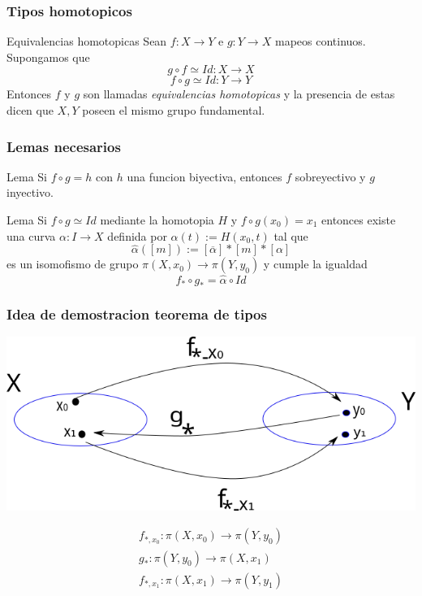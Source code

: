 \documentclass[xetex,mathserif,serif]{beamer}
\begin{document}
  \begin{frame}
    \frametitle{Tipos homotopicos}
    \begin{block}{Equivalencias homotopicas}
      Sean \(f : X \to Y\) e \(g : Y \to X\) mapeos continuos. Supongamos
      que \[ g \circ f \simeq Id : X \to X \]
      \[ f \circ g \simeq Id : Y \to Y \]
      Entonces \(f\) y \(g\) son llamadas \emph{equivalencias
      homotopicas} y la presencia de estas dicen que \(X,Y\) poseen el
      mismo grupo fundamental.
    \end{block}

  \end{frame}
  \begin{frame}
    \frametitle{Lemas necesarios}
    \begin{block}{Lema}
      Si \(f \circ g = h\) con \(h\) una funcion biyectiva, entonces
      \(f\) sobreyectivo y \(g\) inyectivo.
    \end{block}
    \begin{block}{Lema}
      Si \(f \circ g \simeq Id\) mediante la homotopia \(H\) y \(f \circ
      g (x_0) = x_1\) entonces existe una curva \(\alpha : I \to X\)
      definida por \(\alpha (t) := H (x_0 , t)\) tal que
      \[ \hat \alpha \left( [m] \right) := [ \overline \alpha] * [m] * [\alpha]\]
      es un isomofismo de grupo \(\pi(X,x_0) \to \pi (Y,y_0)\) y cumple
      la igualdad
      \[ f_* \circ g_* = \hat \alpha \circ Id \]
    \end{block}
  \end{frame}

  \begin{frame}
    \frametitle{Idea de demostracion teorema de tipos}
    \begin{center}
      \includegraphics[scale=0.5]{./imag/teo_tipos.png}
    \end{center}
    \begin{gather*}
      f_{*,x_0} : \pi (X, x_0) \to \pi (Y, y_0) \\
      g_* : \pi (Y, y_0) \to \pi (X, x_1) \\
      f_{*,x_1} : \pi (X, x_1) \to \pi (Y, y_1)
    \end{gather*}
  \end{frame}
\end{document}
